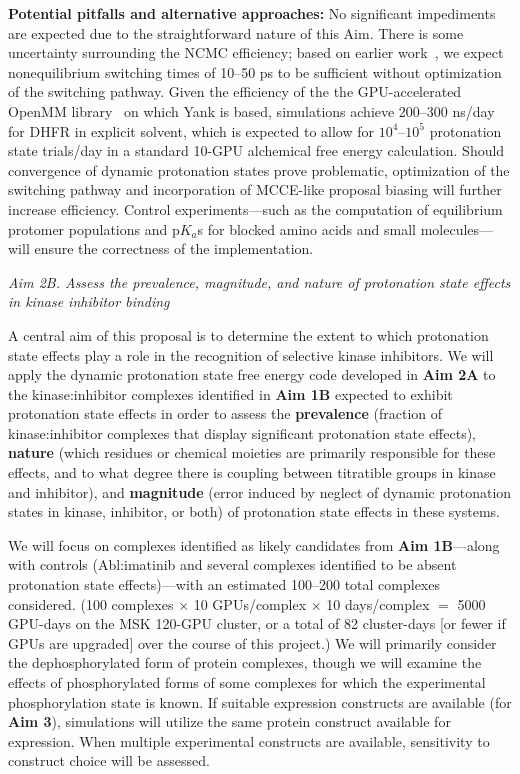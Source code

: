 \documentclass[11pt]{article}
\begin{document}
{\bf Potential pitfalls and alternative approaches:} 
No significant impediments are expected due to the straightforward nature of this Aim. 
There is some uncertainty surrounding the NCMC efficiency; based on earlier work~\cite{stern:jcp:2007:constant-pH,roux:jctc:2015:constant-pH-ncmc}, we expect nonequilibrium switching times of 10--50 ps to be sufficient without optimization of the switching pathway.
Given the efficiency of the the GPU-accelerated OpenMM library~\cite{eastman:jctc:2012:openmm} on which {\sc Yank} is based, simulations achieve 200--300 ns/day for DHFR in explicit solvent, which is expected to allow for $10^4$--$10^5$ protonation state trials/day in a standard 10-GPU alchemical free energy calculation.
Should convergence of dynamic protonation states prove problematic, optimization of the switching pathway and incorporation of MCCE-like proposal biasing will further increase efficiency.
Control experiments---such as the computation of equilibrium protomer populations and p$K_a$s for blocked amino acids and small molecules---will ensure the correctness of the implementation.

\emph{Aim 2B. Assess the prevalence, magnitude, and nature of protonation state effects in kinase inhibitor binding}

A central aim of this proposal is to determine the extent to which protonation state effects play a role in the recognition of selective kinase inhibitors.
We will apply the dynamic protonation state free energy code developed in {\bf Aim 2A} to the kinase:inhibitor complexes identified in {\bf Aim 1B} expected to exhibit protonation state effects in order to assess the {\bf prevalence} (fraction of kinase:inhibitor complexes that display significant protonation state effects), {\bf nature} (which residues or chemical moieties are primarily responsible for these effects, and to what degree there is coupling between titratible groups in kinase and inhibitor), and {\bf magnitude} (error induced by neglect of dynamic protonation states in kinase, inhibitor, or both) of protonation state effects in these systems.

\eject

We will focus on complexes identified as likely candidates from {\bf Aim 1B}---along with controls (Abl:imatinib and several complexes identified to be absent protonation state effects)---with an estimated 100--200 total complexes considered.
(100 complexes $\times$ 10 GPUs/complex $\times$ 10 days/complex $=$ 5000 GPU-days on the MSK 120-GPU cluster, or a total of 82 cluster-days [or fewer if GPUs are upgraded] over the course of this project.)
We will primarily consider the dephosphorylated form of protein complexes, though we will examine the effects of phosphorylated forms of some complexes for which the experimental phosphorylation state is known.
If suitable expression constructs are available (for {\bf Aim 3}), simulations will utilize the same protein construct available for expression.
When multiple experimental constructs are available, sensitivity to construct choice will be assessed.
 
\end{document}
